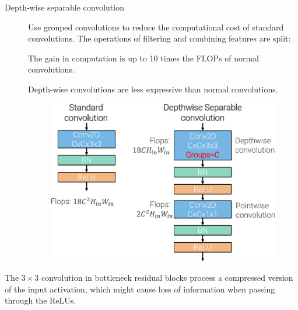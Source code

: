 \begin{description}
    \item[Depth-wise separable convolution]  
        Use grouped convolutions to reduce the computational cost of standard convolutions. The operations of filtering and combining features are split:

        \begin{remark}
            The gain in computation is up to 10 times the FLOPs of normal convolutions.
        \end{remark}

        \begin{remark}
            Depth-wise convolutions are less expressive than normal convolutions.
        \end{remark}

        \begin{figure}[H]
            \centering
            \includegraphics[width=0.45\linewidth]{./img/_depthwise_conv.pdf}
        \end{figure}
\end{description}

\begin{remark}
    The $3 \times 3$ convolution in bottleneck residual blocks process a compressed version of the input activation, which might cause loss of information when passing through the ReLUs.
\end{remark}

